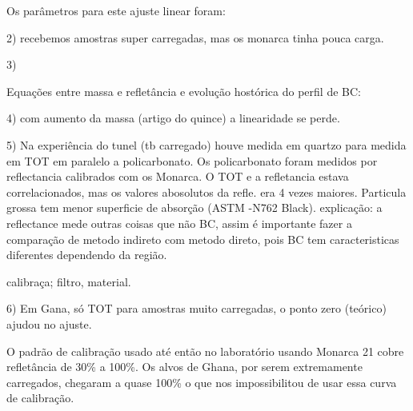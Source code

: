 Os parâmetros para este ajuste linear foram:





2) recebemos amostras super carregadas, mas os monarca tinha pouca carga.

3) 

Equações entre massa e refletância e evolução hostórica do perfil de BC:

4) com aumento da massa (artigo do quince) a linearidade se perde. 

5) Na experiência do tunel (tb carregado) houve medida em quartzo para medida
em TOT em paralelo a policarbonato. Os policarbonato foram medidos por reflectancia
calibrados com os Monarca. O TOT e a refletancia estava correlacionados, mas
os valores abosolutos da refle. era 4 vezes maiores.
Particula grossa tem menor superficie de absorção (ASTM -N762 Black). 
explicação: a reflectance mede outras coisas que não BC, assim é importante
fazer a comparação de metodo indireto com metodo direto, pois BC tem caracteristicas
diferentes dependendo da região.

calibraça; filtro, material.

6) Em Gana, só TOT para amostras muito carregadas, o ponto zero (teórico)
ajudou no ajuste.

O padrão de calibração usado até então no laboratório usando Monarca 21 cobre refletância de 30\% a 100\%. 
Os alvos de Ghana, por serem extremamente carregados, chegaram a quase 100\% o que nos impossibilitou de usar 
essa curva de calibração.  

